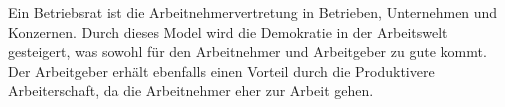 Ein Betriebsrat ist die Arbeitnehmervertretung in Betrieben, Unternehmen und Konzernen.
Durch dieses Model wird die Demokratie in der Arbeitswelt gesteigert, was sowohl für den Arbeitnehmer und Arbeitgeber zu gute kommt.
\newline
Der Arbeitgeber erhält ebenfalls einen Vorteil durch die Produktivere Arbeiterschaft, da die Arbeitnehmer eher zur Arbeit gehen.